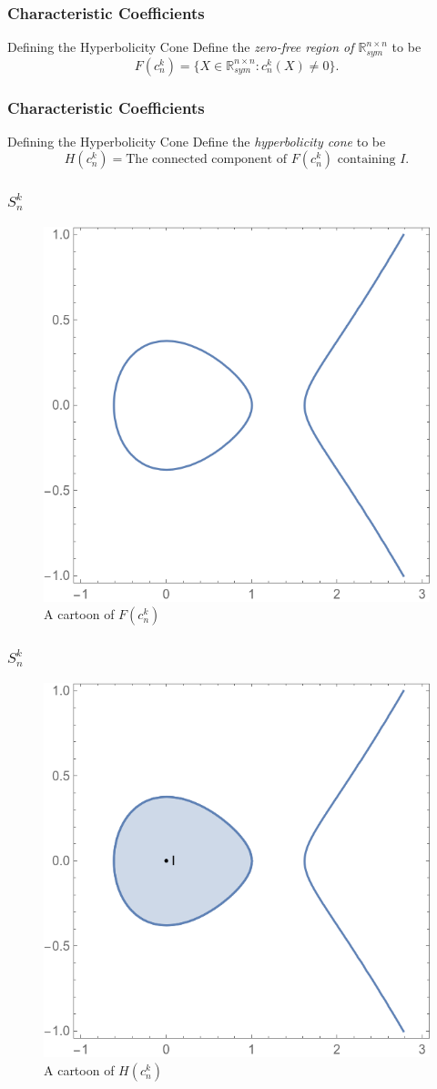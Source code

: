 \documentclass{beamer}
\newcommand{\R}{\mathbb{R}}
\newcommand{\Sym}{\R^{n\times n}_{sym}}
\begin{document}
\begin{frame}
    \frametitle{Characteristic Coefficients}
    \begin{block}{Defining the Hyperbolicity Cone}
        Define the \emph{zero-free region of $\Sym$} to be 
        \[
            F(c^k_n) = \{ X \in \Sym : c_n^k(X) \neq 0\}.
        \]
    \end{block}
\end{frame}
\begin{frame}
    \frametitle{Characteristic Coefficients}
    \begin{block}{Defining the Hyperbolicity Cone}
        Define the \emph{hyperbolicity cone} to be 
        \[
            H(c^k_n) = \text{The connected component of }F(c^k_n) \text{ containing }I.
        \]
    \end{block}
\end{frame}
\begin{frame}
    \frametitle{$S^k_n$}
    \begin{figure}[h]
        \centering
        \includegraphics[width=0.6\linewidth]{variety.png}
        \caption{A cartoon of $F(c^k_n)$}%
        \label{fig:variety}
    \end{figure}
\end{frame}
\begin{frame}
    \frametitle{$S^k_n$}
    \begin{figure}[h]
        \centering
        \includegraphics[width=0.6\linewidth]{hcone.png}
        \caption{A cartoon of $H(c^k_n)$}%
        \label{fig:variety}
    \end{figure}
\end{frame}
\end{document}
